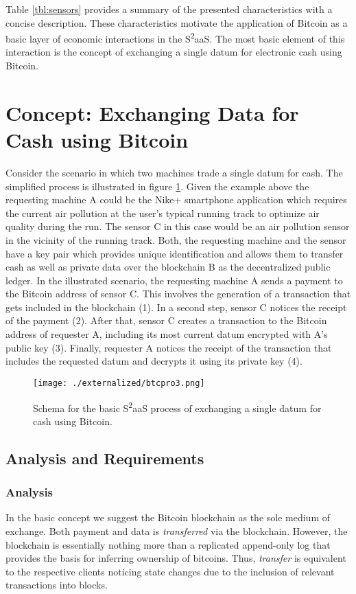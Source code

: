 Table \ref{tbl:sensors} provides a summary of the presented characteristics with a concise description. These characteristics motivate the application of Bitcoin as a basic layer of economic interactions in the S\textsuperscript{2}aaS. The most basic element of this interaction is the concept of exchanging a single datum for electronic cash using Bitcoin.

\section{Concept: Exchanging Data for Cash using Bitcoin}
\label{sec:s2aas_concept}

Consider the scenario in which two machines trade a single datum for cash. The simplified process is illustrated in figure \ref{fig:btcDataExchange}. Given the example above the requesting machine A could be the Nike+ smartphone application which requires the current air pollution at the user's typical running track to optimize air quality during the run. The sensor C in this case would be an air pollution sensor in the vicinity of the running track. Both, the requesting machine and the sensor have a key pair which provides unique identification and allows them to transfer cash as well as private data over the blockchain B as the decentralized public ledger. 
In the illustrated scenario, the requesting machine A sends a payment to the Bitcoin address of sensor C. This involves the generation of a transaction that gets included in the blockchain (1). In a second step, sensor C notices the receipt of the payment (2). After that, sensor C creates a transaction to the Bitcoin address of requester A, including its most current datum encrypted with A's public key (3). Finally, requester A notices the receipt of the transaction that includes the requested datum and decrypts it using its private key (4).

\begin{figure}
\centering
\texttt{[image: ./externalized/btcpro3.png]}
\caption{Schema for the basic S\textsuperscript{2}aaS process of exchanging a single datum for cash using Bitcoin.}
\label{fig:btcDataExchange}
\end{figure}

\subsection{Analysis and Requirements}
\label{sec:s2aas_analysis}

\subsubsection{Analysis}
In the basic concept we suggest the Bitcoin blockchain as the sole medium of exchange. Both payment and data is \emph{transferred} via the blockchain. However, the blockchain is essentially nothing more than a replicated append-only log that provides the basis for inferring ownership of bitcoins. Thus, \emph{transfer} is equivalent to the respective clients noticing state changes due to the inclusion of relevant transactions into blocks.

